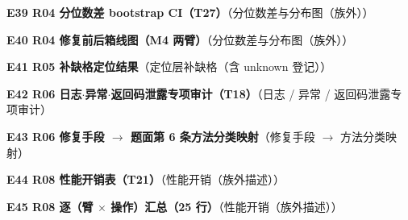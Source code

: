 \documentclass[UTF8,fontset=fandol,11pt,a4paper]{ctexart}
\begin{document}
\begin{samepage}\noindent\textbf{E39 R04 分位数差 bootstrap CI（T27）}（分位数差与分布图（族外））\par\noindent {}\par\vspace{1.5mm}\end{samepage}
\begin{samepage}\noindent\textbf{E40 R04 修复前后箱线图（M4 两臂）}（分位数差与分布图（族外））\par\noindent \texttt{}\par\vspace{1.5mm}\end{samepage}
\begin{samepage}\noindent\textbf{E41 R05 补缺格定位结果}（定位层补缺格（含 unknown 登记））\par\noindent {}\par\vspace{1.5mm}\end{samepage}
\begin{samepage}\noindent\textbf{E42 R06 日志\texorpdfstring{$\cdot$}{.}异常\texorpdfstring{$\cdot$}{.}返回码泄露专项审计（T18）}（日志 / 异常 / 返回码泄露专项审计）\par\noindent {}\par\vspace{1.5mm}\end{samepage}
\begin{samepage}\noindent\textbf{E43 R06 修复手段 \texorpdfstring{$\rightarrow$}{->} 题面第 6 条方法分类映射}（修复手段 \texorpdfstring{$\rightarrow$}{->} 方法分类映射）\par\noindent {}\par\vspace{1.5mm}\end{samepage}
\begin{samepage}\noindent\textbf{E44 R08 性能开销表（T21）}（性能开销（族外描述））\par\noindent {}\par\vspace{1.5mm}\end{samepage}
\begin{samepage}\noindent\textbf{E45 R08 逐（臂 \texorpdfstring{$\times$}{x} 操作）汇总（25 行）}（性能开销（族外描述））\par\noindent {}\par\vspace{1.5mm}\end{samepage}
\end{document}

